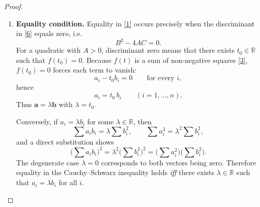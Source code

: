 \begin{proof}
\begin{enumerate}
\item \textbf{Equality condition.}  
Equality in \eqref{1} occurs precisely when the discriminant in \eqref{6} equals zero, i.e.  
\begin{equation}
B^{2}-4AC=0.
\tag{7}
\end{equation}
For a quadratic with $A>0$, discriminant zero means that there exists $t_{0}\in\mathbb R$ such that $f(t_{0})=0$.  
Because $f(t)$ is a sum of non‑negative squares \eqref{3}, $f(t_{0})=0$ forces each term to vanish:
\[
a_{i}-t_{0}b_{i}=0\qquad\text{for every }i,
\]
hence  
\begin{equation}
a_{i}=t_{0}\,b_{i}\qquad(i=1,\dots ,n).
\tag{8}
\end{equation}
Thus $\mathbf a=\lambda\mathbf b$ with $\lambda=t_{0}$.  

Conversely, if $a_{i}=\lambda b_{i}$ for some $\lambda\in\mathbb R$, then
\[
\sum a_{i}b_{i}= \lambda\sum b_{i}^{2},\qquad
\sum a_{i}^{2}= \lambda^{2}\sum b_{i}^{2},
\]
and a direct substitution shows
\[
\bigl(\sum a_{i}b_{i}\bigr)^{2}
= \lambda^{2}\bigl(\sum b_{i}^{2}\bigr)^{2}
= \bigl(\sum a_{i}^{2}\bigr)\bigl(\sum b_{i}^{2}\bigr).
\]
The degenerate case $\lambda=0$ corresponds to both vectors being zero.  
Therefore equality in the Cauchy–Schwarz inequality holds \emph{iff} there exists $\lambda\in\mathbb R$ such that $a_{i}=\lambda b_{i}$ for all $i$.

\end{enumerate}
\end{proof}